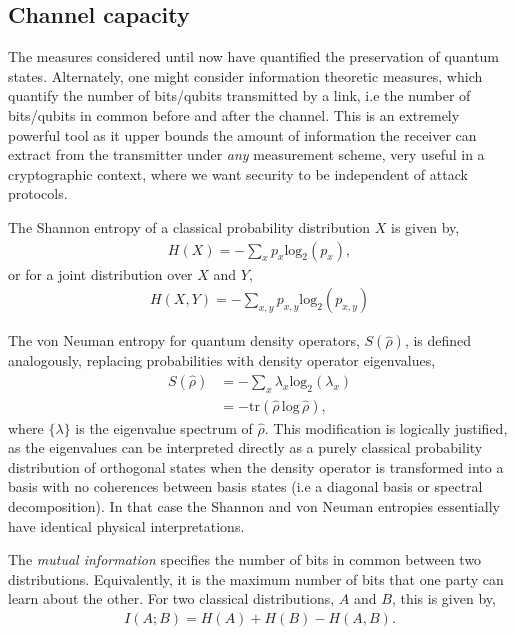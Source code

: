 \documentclass[aps,rmp,twocolumn,amsmath,amssymb,nofootinbib,superscriptaddress,longbibliography,floatfix]{revtex4-1}
\begin{document}
%
%

\subsection{Channel capacity}

The measures considered until now have quantified the preservation of quantum states. Alternately, one might consider information theoretic measures, which quantify the number of bits/qubits transmitted by a link, i.e the number of bits/qubits in common before and after the channel. This is an extremely powerful tool as it upper bounds the amount of information the receiver can extract from the transmitter under \emph{any} measurement scheme, very useful in a cryptographic context, where we want security to be independent of attack protocols.

The Shannon entropy \cite{???} of a classical probability distribution $X$ is given by,
\begin{align}
H(X) = -\sum_x p_x\mathrm{log}_2(p_x),
\end{align}
or for a joint distribution over $X$ and $Y$,
\begin{align}
H(X,Y) =  -\sum_{x,y} p_{x,y}\mathrm{log}_2(p_{x,y})
\end{align}

The von Neuman entropy \cite{???} for quantum density operators, $S(\hat\rho)$, is defined analogously, replacing probabilities with density operator eigenvalues,
\begin{align}
S(\hat\rho) &= - \sum_x \lambda_x \mathrm{log}_2 (\lambda_x) \nonumber \\
&= -\mathrm{tr}(\hat\rho\,\mathrm{log}\,\hat\rho),
\end{align}
where $\{\lambda\}$ is the eigenvalue spectrum of $\hat\rho$. This modification is logically justified, as the eigenvalues can be interpreted directly as a purely classical probability distribution of orthogonal states when the density operator is transformed into a basis with no coherences between basis states (i.e a diagonal basis or spectral decomposition). In that case the Shannon and von Neuman entropies essentially have identical physical interpretations.

The \emph{mutual information} specifies the number of bits in common between two distributions. Equivalently, it is the maximum number of bits that one party can learn about the other. For two classical distributions, $A$ and $B$, this is given by,
\begin{align}
I(A;B) = H(A) + H(B) - H(A,B).
\end{align}
\end{document}
